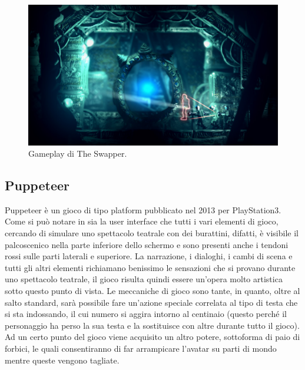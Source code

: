 \begin{figure}[h]
\centerline{\includegraphics[scale=0.3]{images/statoarte/tsgameplay.png}}
\caption{Gameplay di The Swapper.}
\label{fig:pgameplay}
\end{figure}


\subsection{Puppeteer}

Puppeteer è un gioco di tipo platform pubblicato nel 2013 per PlayStation3. Come si può notare in \myfig{\ref{fig:pgameplay}} sia la user interface che tutti i vari elementi di gioco, cercando di simulare uno spettacolo teatrale con dei burattini, difatti, è visibile il palcoscenico nella parte inferiore dello schermo e sono presenti anche i tendoni rossi sulle parti laterali e superiore. La narrazione, i dialoghi, i cambi di scena e tutti gli altri elementi richiamano benissimo le sensazioni che si provano durante uno spettacolo teatrale, il gioco risulta quindi essere un'opera molto artistica sotto questo punto di vista. Le meccaniche di gioco sono tante, in quanto, oltre al salto standard, sarà possibile fare un'azione speciale correlata al tipo di testa che si sta indossando, il cui numero si aggira intorno al centinaio (questo perché il personaggio ha perso la sua testa e la sostituisce con altre durante tutto il gioco). Ad un certo punto del gioco viene acquisito un altro potere, sottoforma di paio di forbici, le quali consentiranno di far arrampicare l'avatar su parti di mondo mentre queste vengono tagliate.

